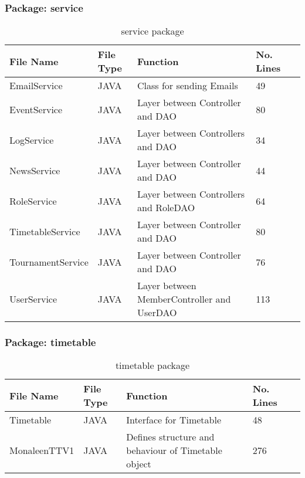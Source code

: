 \subsubsection{Package: service}
\begin{table}[H]
\begin{center}
      \begin{tabular}{| l | l | l| l |p{1cm} |}
    \hline
    File Name & File Type & Function & No. Lines\\ \hline
	EmailService & JAVA & Class for sending Emails & 49\\ \hline
    EventService & JAVA & Layer between Controller and DAO & 80\\ \hline
    LogService & JAVA & Layer between Controllers and DAO & 34\\ \hline
	NewsService & JAVA & Layer between Controller and DAO & 44\\ \hline
	RoleService & JAVA & Layer between Controllers and RoleDAO & 64\\ \hline
	TimetableService & JAVA & Layer between Controller and DAO & 80\\ \hline
	TournamentService & JAVA & Layer between Controller and DAO & 76\\ \hline
	UserService & JAVA & Layer between MemberController and UserDAO & 113\\ \hline
    \end{tabular}
\end{center}
\caption{service package}
\end{table}

\subsubsection{Package: timetable}
\begin{table}[H]
\begin{center}
    \begin{tabular}{| l | l | l| l |p{1cm} |}
    \hline
    File Name & File Type & Function & No. Lines\\ \hline
    Timetable & JAVA & Interface for Timetable & 48\\ \hline
	MonaleenTTV1 & JAVA & Defines structure and behaviour of Timetable object & 276\\ \hline
    \end{tabular}
\end{center}
\caption{timetable package}
\end{table}

